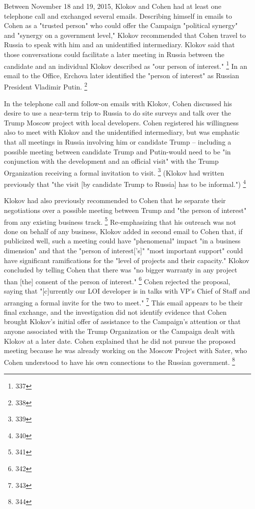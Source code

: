 Between November 18 and 19, 2015, Klokov and Cohen had at least one telephone call and exchanged several emails.
Describing himself in emails to Cohen as a "trusted person" who could offer the Campaign "political synergy" and "synergy on a government level," Klokov recommended that Cohen travel to Russia to speak with him and an unidentified intermediary.
Klokov said that those conversations could facilitate a later meeting in Russia between the candidate and an individual Klokov described as "our person of interest."%
\footnote{337}
In an email to the Office, Erchova later identified the "person of interest" as Russian President Vladimir Putin.%
\footnote{338}

In the telephone call and follow-on emails with Klokov, Cohen discussed his desire to use a near-term trip to Russia to do site surveys and talk over the Trump Moscow project with local developers.
Cohen registered his willingness also to meet with Klokov and the unidentified intermediary, but was emphatic that all meetings in Russia involving him or candidate Trump -- including a possible meeting between candidate Trump and Putin-would need to be "in conjunction with the development and an official visit" with the Trump Organization receiving a formal invitation to visit.%
\footnote{339}
(Klokov had written previously that "the visit [by candidate Trump to Russia] has to be informal.")%
\footnote{340}

Klokov had also previously recommended to Cohen that he separate their negotiations over a possible meeting between Trump and "the person of interest" from any existing business track.%
\footnote{341}
Re-emphasizing that his outreach was not done on behalf of any business, Klokov added in second email to Cohen that, if publicized well, such a meeting could have "phenomenal" impact "in a business dimension" and that the "person of interest['s]" "most important support" could have significant ramifications for the "level of projects and their capacity."
Klokov concluded by telling Cohen that there was "no bigger warranty in any project than [the] consent of the person of interest."%
\footnote{342}
Cohen rejected the proposal, saying that "[c]urrently our LOI developer is in talks with VP's Chief of Staff and arranging a formal invite for the two to meet."%
\footnote{343}
This email appears to be their final exchange, and the investigation did not identify evidence that Cohen brought Klokov's initial offer of assistance to the Campaign's attention or that anyone associated with the Trump Organization or the Campaign dealt with Klokov at a later date.
Cohen explained that he did not pursue the proposed meeting because he was already working on the Moscow Project with Sater, who Cohen understood to have his own connections to the Russian government.%
\footnote{344}

